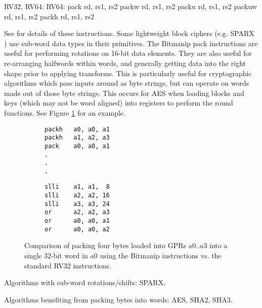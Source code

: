 \begin{cryptobitmanipisa}
RV32, RV64:                         RV64: 
    pack   rd, rs1, rs2                 packw  rd, rs1, rs2
    packu  rd, rs1, rs2                 packuw rd, rs1, rs2
    packh  rd, rs1, rs2
\end{cryptobitmanipisa}

See \cite[Section 2.1.4]{riscv:bitmanip:draft} for details of
these instructions.
Some lightweight block ciphers
(e.g. SPARX \cite{DPUVGB:16})
use sub-word data types in their primitives.
The Bitmanip pack instructions are useful for performing rotations on
16-bit data elements.
They are also useful for re-arranging halfwords within words, and
generally getting data into the right shape prior to applying transforms.
This is particularly useful for cryptographic algorithms which pass inputs
around as byte strings, but can operate on words made out of those byte
strings.
This occurs for AES when loading blocks and keys (which may not be
word aligned) into registers to perform the round functions.
See Figure \ref{fig:example:pack} for an example.

\begin{figure}
\begin{subfigure}[t]{0.5\textwidth}
\begin{lstlisting}
packh   a0, a0, a1
packh   a1, a2, a3
pack    a0, a0, a1
.
.
.
\end{lstlisting}
\end{subfigure}
\begin{subfigure}[t]{0.5\textwidth}
\begin{lstlisting}
slli    a1, a1,  8
slli    a2, a2, 16
slli    a3, a3, 24
or      a2, a2, a3
or      a0, a0, a1
or      a0, a0, a2
\end{lstlisting}
\end{subfigure}
\caption{Comparison of packing four bytes loaded into GPRs $a0..a3$ into
a single 32-bit word in $a0$ using the Bitmanip \mnemonic[pack*] instructions
vs. the standard RV32 instructions.}
\label{fig:example:pack}
\end{figure}

Algorithms with sub-word rotations/shifts:
SPARX.

Algorithms benefiting from packing bytes into words:
AES, SHA2, SHA3.

